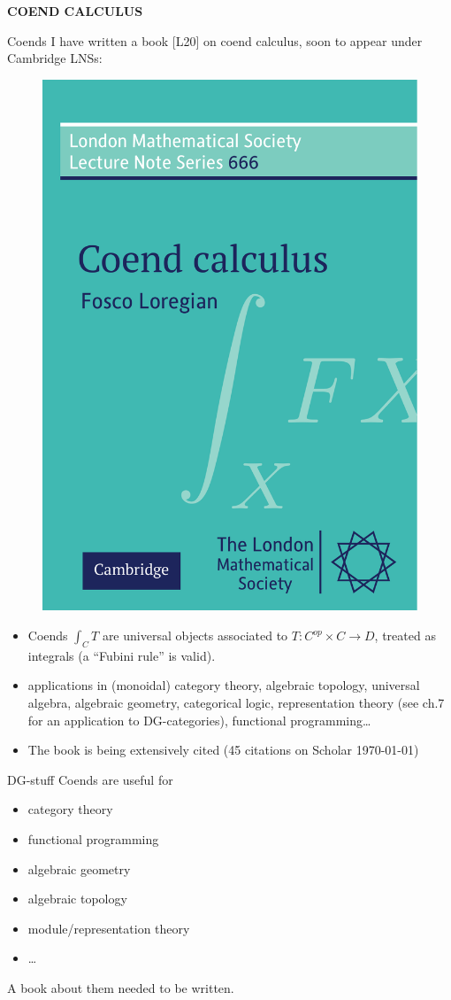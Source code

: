 \documentclass[handout]{beamer}
\def\lnk#1{\href{#1}{\faFilePdfO}}
\begin{document}
%
%
%
%
%
%
\begin{frame}
  \Huge\centering \bfseries COEND CALCULUS%
\end{frame}
%
\begin{frame}{Coends}
  I have written a book [\alert{L20}\lnk{https://arxiv.org/pdf/1501.02503}] on \alert{coend calculus}, soon to appear under Cambridge LNSs:
\begin{figure}
  \includegraphics[width=.35\textwidth]{cover-2-.pdf}
\end{figure}
\small
\begin{itemize}
  \item<+-> Coends $\int_C T$ are universal objects associated to $T : C^{op}\times C \to D$, treated as integrals (a ``Fubini rule'' is valid).
  \item<+-> applications in (monoidal) category theory, algebraic topology, universal algebra, algebraic geometry, categorical logic, representation theory (see ch.7 for an application to \alert{DG-categories}), functional programming\dots
  \item<+-> The book is being extensively cited (45 citations on Scholar \today)
\end{itemize}
\end{frame}
%
%
%
%
\begin{frame}{DG-stuff}
  Coends are useful for
\begin{itemize}
  \item category theory
  \item functional programming
  \item algebraic geometry
  \item algebraic topology
  \item module/representation theory
  \item \dots
\end{itemize}
A book about them needed to be written.
\end{frame}
\end{document}
